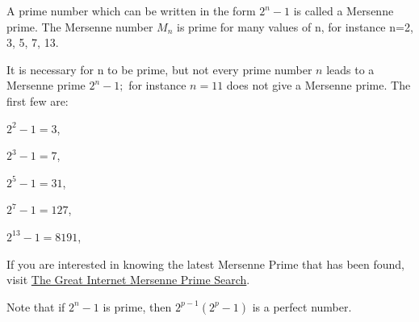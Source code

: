 A prime number which can be written in the form $2^{n}-1$  is called a 
Mersenne prime. The Mersenne number $M_{n}$  is prime for many values of n,
for instance n=2, 3, 5, 7, 13.
\par
It is necessary for n to be prime, but not every prime number $n$ leads to a Mersenne prime $2^{n}-1;$  for instance $n=11$ does 
not give a Mersenne prime. The first few are:
\par $2^{2}-1  = 3$,
\par $2^{3}-1  = 7$,
\par $2^{5}-1  = 31$,
\par $2^{7}-1  = 127$,
\par $2^{13}-1  = 8191$,

\par
If you are interested in knowing the latest Mersenne Prime that has been found, visit \href{http://www.mersenne.org/prime.htm}{The Great Internet Mersenne Prime Search}.

\par
Note that if $2^{n}-1$ is prime, then $2^{p-1}(2^{p}-1)$  is a perfect number.
